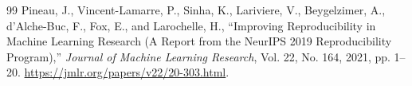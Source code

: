 \documentclass[10pt,letterpaper]{article}
\begin{document}
\begin{thebibliography}{99}
 Pineau, J., Vincent-Lamarre, P., Sinha, K., Lariviere, V., Beygelzimer, A., d'Alche-Buc, F., Fox, E., and Larochelle, H., ``Improving Reproducibility in Machine Learning Research (A Report from the NeurIPS 2019 Reproducibility Program),'' \emph{Journal of Machine Learning Research}, Vol. 22, No. 164, 2021, pp. 1--20. \url{https://jmlr.org/papers/v22/20-303.html}.
\end{thebibliography}

\endgroup
\end{document}
